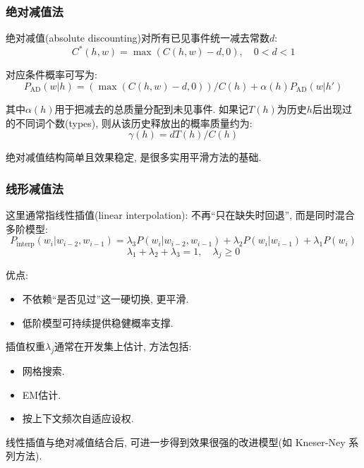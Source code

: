 \subsubsection{绝对减值法}


绝对减值(absolute discounting)对所有已见事件统一减去常数$d$:
\[
C^*(h,w) = \max(C(h,w)-d, 0), \quad 0 < d < 1
\]

对应条件概率可写为:
\[
P_{\operatorname{AD}}(w|h)
  = (\max(C(h,w)-d, 0))/C(h)
    + \alpha(h) P_{\operatorname{AD}}(w|h')
\]

其中$\alpha(h)$用于把减去的总质量分配到未见事件.
如果记$T(h)$为历史$h$后出现过的不同词个数(types),
则从该历史释放出的概率质量约为:
\[
\gamma(h) = d T(h) / C(h)
\]

绝对减值结构简单且效果稳定, 是很多实用平滑方法的基础.

\subsubsection{线形减值法}


这里通常指线性插值(linear interpolation):
不再“只在缺失时回退”, 而是同时混合多阶模型:
\[
P_{\operatorname{interp}}(w_i | w_{i-2}, w_{i-1})
  = \lambda_3 P(w_i | w_{i-2}, w_{i-1})
  + \lambda_2 P(w_i | w_{i-1})
  + \lambda_1 P(w_i)
\]
\[
\lambda_1 + \lambda_2 + \lambda_3 = 1, \quad \lambda_j \ge 0
\]

优点:

\begin{itemize}
\item 不依赖“是否见过”这一硬切换, 更平滑.
\item 低阶模型可持续提供稳健概率支撑.
\end{itemize}

插值权重$\lambda_j$通常在开发集上估计, 方法包括:

\begin{itemize}
\item 网格搜索.
\item EM估计.
\item 按上下文频次自适应设权.
\end{itemize}

线性插值与绝对减值结合后, 可进一步得到效果很强的改进模型(如 Kneser-Ney 系列方法).
